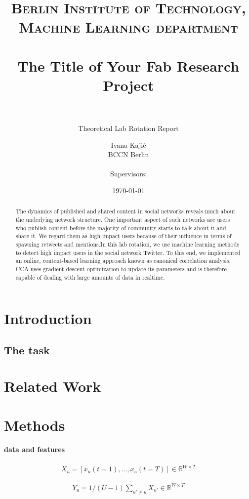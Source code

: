 \documentclass[abstracton, paper=a4, fontsize=11pt]{scrartcl} %
\title{	
\normalfont \normalsize 
\textsc{Berlin Institute of Technology, Machine Learning department} \\ [25pt] %
\horrule{0.5pt} \\[0.4cm] %
\huge The Title of Your Fab Research Project  \\ %
\horrule{0.5pt} \\[0.5cm] %
}
\subtitle{\small Theoretical Lab Rotation Report}
\author{
\customfont \large Ivana Kaji\'c \\ \customfont \large BCCN Berlin \\ \\
\customfont Supervisors: \\
}
\date{\normalsize\today} %
\numberwithin{equation}{section} %
\numberwithin{figure}{section} %
\numberwithin{table}{section} %
\newcommand{\R}{\ensuremath{\mathds{R}}}
\newcommand{\1}{\ensuremath{\mathds{1}}}
\begin{document}
\maketitle %

\begin{abstract}
The dynamics of published and shared content in social networks reveals much about the underlying network structure. One important aspect of such networks are users who publish content before the majority of community starts to talk about it and share it. We regard them as high impact users because of their influence in terms of spawning retweets and mentions.In this lab rotation, we use machine learning methods to detect high impact users in the social network Twitter. To this end, we implemented an online, content-based learning approach known as canonical correlation analysis. CCA uses gradient descent optimization to update its parameters and is therefore capable of dealing with large amounts of data in realtime.

\end{abstract}

\section{Introduction}

\subsection{The task} 

\section{Related Work}

\section{Methods}

\paragraph{data and features} 

\begin{align}
	X_u = [x_u(t=1),\dots,x_u(t=T)] \in\R^{W\times T}
\end{align}

\begin{align}\label{eq:y}
Y_u = 1/(U-1)\sum_{u'\neq u}X_{u'} \in \R^{W\times T}
\end{align}
\end{document}
